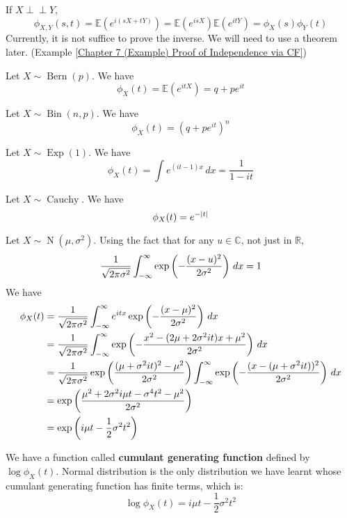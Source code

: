 \documentclass{huhtakm-template-book}
\newcommand{\independent}{\perp\!\!\!\perp}
\newcommand{\expect}{\mathbb{E}}
\DeclareMathOperator{\Bern}{Bern}
\DeclareMathOperator{\Bin}{Bin}
\DeclareMathOperator{\Exp}{Exp}
\DeclareMathOperator{\N}{N}
\DeclareMathOperator{\Cauchy}{Cauchy}
\begin{document}
\begin{proofing}
	If $X\independent Y$,
	\begin{equation*}
		\phi_{X,Y}(s,t)=\expect(e^{i(sX+tY)})=\expect(e^{isX})\expect(e^{itY})=\phi_{X}(s)\phi_{Y}(t)
	\end{equation*}
	Currently, it is not suffice to prove the inverse. We will need to use a theorem later. (Example \ref{Chapter 7 (Example) Proof of Independence via CF})
\end{proofing}
\begin{eg}
	Let $X\sim\Bern(p)$. We have
	\begin{equation*}
		\phi_{X}(t)=\expect(e^{itX})=q+pe^{it}
	\end{equation*}
\end{eg}
\begin{eg}
	Let $X\sim\Bin(n,p)$. We have
	\begin{equation*}
		\phi_{X}(t)=(q+pe^{it})^{n}
	\end{equation*}
\end{eg}
\begin{eg}
	Let $X\sim\Exp(1)$. We have
	\begin{equation*}
		\phi_{X}(t)=\int e^{(it-1)x}\,dx=\frac{1}{1-it}
	\end{equation*}
\end{eg}
\begin{eg}
	Let $X\sim\Cauchy$. We have
	\begin{equation*}
		\phi_{X}(t)=e^{-\left|{t}\right|}
	\end{equation*}
\end{eg}
\begin{eg}
	Let $X\sim\N(\mu,\sigma^{2})$. Using the fact that for any $u\in\mathbb{C}$, not just in $\mathbb{R}$,
	\begin{equation*}
		\frac{1}{\sqrt{2\pi\sigma^{2}}}\int_{-\infty}^{\infty}\exp\left(-\frac{(x-u)^{2}}{2\sigma^{2}}\right)\,dx=1
	\end{equation*}
	We have
	\begin{align*}
		\phi_{X}(t)&=\frac{1}{\sqrt{2\pi\sigma^{2}}}\int_{-\infty}^{\infty} e^{itx}\exp\left(-\frac{(x-\mu)^{2}}{2\sigma^{2}}\right)\,dx\\
		&=\frac{1}{\sqrt{2\pi\sigma^{2}}}\int_{-\infty}^{\infty}\exp\left(-\frac{x^{2}-(2\mu+2\sigma^{2}it)x+\mu^{2}}{2\sigma^{2}}\right)\,dx\\
		&=\frac{1}{\sqrt{2\pi\sigma^{2}}}\exp\left(\frac{(\mu+\sigma^{2}it)^{2}-\mu^{2}}{2\sigma^{2}}\right)\int_{-\infty}^{\infty}\exp\left(-\frac{(x-(\mu+\sigma^{2}it))^{2}}{2\sigma^{2}}\right)\,dx\\
		&=\exp\left(\frac{\mu^{2}+2\sigma^{2}i\mu t-\sigma^{4}t^{2}-\mu^{2}}{2\sigma^{2}}\right)\\
		&=\exp\left(i\mu t-\frac{1}{2}\sigma^{2}t^{2}\right)
	\end{align*}
\end{eg}
\begin{rem}
	We have a function called \textbf{cumulant generating function} defined by $\log\phi_{X}(t)$. Normal distribution is the only distribution we have learnt whose cumulant generating function has finite terms, which is:
	\begin{equation*}
		\log\phi_{X}(t)=i\mu t-\frac{1}{2}\sigma^{2}t^{2}
	\end{equation*}
\end{rem}
\newpage
\end{document}
